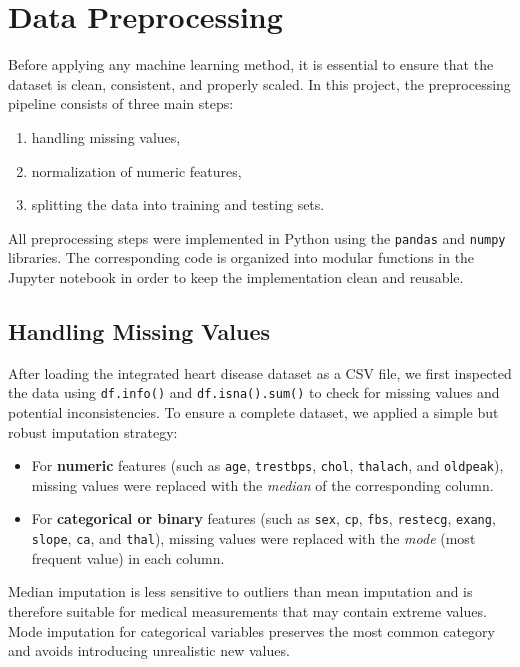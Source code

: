 \section{Data Preprocessing}
Before applying any machine learning method, it is essential to ensure that the dataset is clean, consistent,
and properly scaled. In this project, the preprocessing pipeline consists of three main steps:
\begin{enumerate}
	\item handling missing values,
	\item normalization of numeric features,
	\item splitting the data into training and testing sets.
\end{enumerate}

All preprocessing steps were implemented in Python using the \texttt{pandas} and \texttt{numpy} libraries.
The corresponding code is organized into modular functions in the Jupyter notebook in order to keep the
implementation clean and reusable.

\subsection{Handling Missing Values}
After loading the integrated heart disease dataset as a CSV file, we first inspected the data using
\texttt{df.info()} and \texttt{df.isna().sum()} to check for missing values and potential inconsistencies.
To ensure a complete dataset, we applied a simple but robust imputation strategy:

\begin{itemize}
	\item For \textbf{numeric} features (such as \texttt{age}, \texttt{trestbps}, \texttt{chol},
	\texttt{thalach}, and \texttt{oldpeak}), missing values were replaced with the
	\emph{median} of the corresponding column.
	\item For \textbf{categorical or binary} features (such as \texttt{sex}, \texttt{cp},
	\texttt{fbs}, \texttt{restecg}, \texttt{exang}, \texttt{slope}, \texttt{ca}, and \texttt{thal}),
	missing values were replaced with the \emph{mode} (most frequent value) in each column.
\end{itemize}

Median imputation is less sensitive to outliers than mean imputation and is therefore suitable
for medical measurements that may contain extreme values. Mode imputation for categorical
variables preserves the most common category and avoids introducing unrealistic new values.

